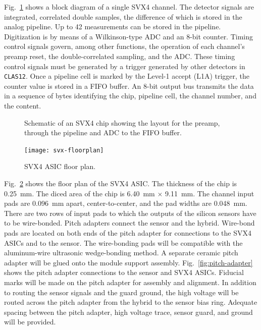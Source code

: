 Fig.~\ref{fig:svx-channel-sch} shows a block diagram of a single SVX4 
channel.  The detector signals are integrated, correlated double samples, 
the difference of which is stored in the analog pipeline.  Up to 42 
measurements can be stored in the pipeline.  Digitization is by means of a 
Wilkinson-type ADC and an 8-bit counter.  Timing control signals govern, 
among other functions, the operation of each channel's preamp reset, the 
double-correlated sampling, and the ADC.  These timing control signals must 
be generated by a trigger generated by other detectors in {\tt CLAS12}.
Once a pipeline cell is marked by the Level-1 accept (L1A) trigger, the 
counter value is stored in a FIFO buffer.  An 8-bit output bus transmits 
the data in a sequence of bytes identifying the chip, pipeline cell, the 
channel number, and the content.

\begin{figure}[htbp]
\vspace{5.7cm}
\caption{\small{Schematic of an SVX4 chip showing the layout for the
preamp, through the pipeline and ADC to the FIFO buffer.}}
\label{fig:svx-channel-sch}
\end{figure}

\begin{figure}[htbp]
\centering
\texttt{[image: svx-floorplan]}
\caption{\small{SVX4 ASIC floor plan.}}
\label{fig:svx-floorplan}
\end{figure}

Fig.~\ref{fig:svx-floorplan} shows the floor plan of the SVX4 ASIC.
The thickness of the chip is 0.25~mm.  The diced area of the chip is 
6.40~mm $\times$ 9.11~mm.  The channel input pads are 0.096~mm apart, 
center-to-center, and the pad widths are 0.048~mm.  There are two rows 
of input pads to which the outputs of the silicon sensors have to be 
wire-bonded.  Pitch adapters connect the sensor and the hybrid.  Wire-bond 
pads are located on both ends of the pitch adapter for connections to the 
SVX4 ASICs and to the sensor.  The wire-bonding pads will be compatible 
with the aluminum-wire ultrasonic wedge-bonding method.  A separate ceramic
pitch adapter will be glued onto the module support assembly.
Fig.~\ref{fig:pitch-adapter} shows the pitch adapter connections to the 
sensor and SVX4 ASICs.  Fiducial marks will be made on the pitch adapter
for assembly and alignment.  In addition to routing the sensor signals and 
the guard ground, the high voltage will be routed across the pitch adapter 
from the hybrid to the sensor bias ring.  Adequate spacing between the pitch 
adapter, high voltage trace, sensor guard, and ground will be provided.

